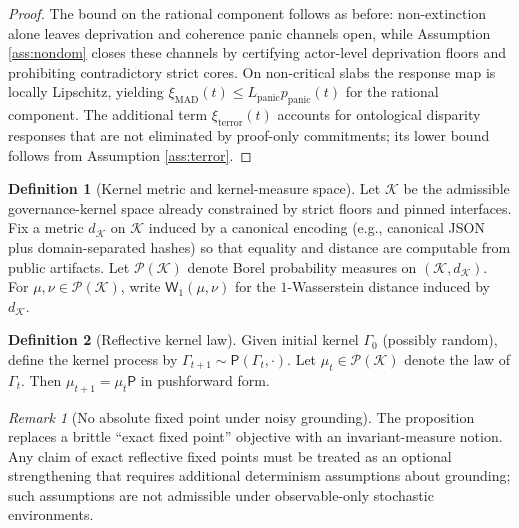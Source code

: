 \documentclass[11pt,a4paper]{article}
\theoremstyle{definition}
\newtheorem{definition}{Definition}
\theoremstyle{remark}
\newtheorem{remark}{Remark}
\begin{document}
\begin{proof}
The bound on the rational component follows as before: non-extinction alone leaves deprivation and coherence panic channels open, while Assumption \ref{ass:nondom} closes these channels by certifying actor-level deprivation floors and prohibiting contradictory strict cores.
On non-critical slabs the response map is locally Lipschitz, yielding $\xi_{\mathrm{MAD}}(t)\le L_{\mathrm{panic}}p_{\mathrm{panic}}(t)$ for the rational component.
The additional term $\xi_{\mathrm{terror}}(t)$ accounts for ontological disparity responses that are not eliminated by proof-only commitments; its lower bound follows from Assumption \ref{ass:terror}.
\end{proof}



\begin{definition}[Kernel metric and kernel-measure space]\label{def:kernel_metric_and_measure_space}
Let $\mathcal K$ be the admissible governance-kernel space already constrained by strict floors and pinned interfaces.
Fix a metric $d_{\mathcal K}$ on $\mathcal K$ induced by a canonical encoding (e.g., canonical JSON plus domain-separated hashes) so that equality and distance are computable from public artifacts.
Let $\mathcal P(\mathcal K)$ denote Borel probability measures on $(\mathcal K,d_{\mathcal K})$.
For $\mu,\nu\in\mathcal P(\mathcal K)$, write $\mathsf W_1(\mu,\nu)$ for the $1$-Wasserstein distance induced by $d_{\mathcal K}$.
\end{definition}

\begin{definition}[Reflective kernel law]\label{def:reflective_kernel_law}
Given initial kernel $\Gamma_0$ (possibly random), define the kernel process by $\Gamma_{t+1}\sim \mathsf P(\Gamma_t,\cdot)$.
Let $\mu_t\in\mathcal P(\mathcal K)$ denote the law of $\Gamma_t$.
Then $\mu_{t+1}=\mu_t\mathsf P$ in pushforward form.
\end{definition}
\begin{remark}[No absolute fixed point under noisy grounding]\label{rem:no_absolute_fixed_point_under_noisy_grounding}
The proposition replaces a brittle ``exact fixed point'' objective with an invariant-measure notion.
Any claim of exact reflective fixed points must be treated as an optional strengthening that requires additional determinism assumptions about grounding; such assumptions are not admissible under observable-only stochastic environments.
\end{remark}
\end{document}

